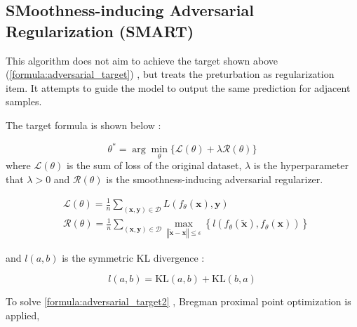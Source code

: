 \documentclass[10pt,twocolumn,letterpaper]{article}
\begin{document}
\subsection{SMoothness-inducing Adversarial Regularization (SMART)}

This algorithm does not aim to achieve the target shown above (\cref{formula:adversarial_target}) , but treats the preturbation as regularization item. It attempts to guide the model to output the same prediction for adjacent samples. 

The target formula is shown below :

\begin{equation}
  \theta^*=\arg\min_\theta\{\mathcal{L}(\theta)+\lambda \mathcal{R}(\theta)\}
  \tag{2:4:1}
  \label{formula:adversarial_target2}
\end{equation}
where $\mathcal{L}(\theta)$ is the sum of loss of the original dataset, $\lambda$ is the hyperparameter that $\lambda>0$ and $\mathcal{R}(\theta)$ is the smoothness-inducing adversarial regularizer.

$$
\begin{aligned}
  &\mathcal{L}(\theta)=\frac{1}{n}\sum_{(\mathbf{x}, \mathbf{y})\in\mathcal{D}} L(f_\theta(\mathbf{x}), \mathbf{y}) \\
  &\mathcal{R}(\theta)=\frac{1}{n}\sum_{(\mathbf{x}, \mathbf{y})\in\mathcal{D}} \max_{\left\Vert \tilde{\mathbf{x}}-\mathbf{x}\right\Vert\leq \epsilon}\left\{l\left(f_\theta(\tilde{\mathbf{x}}), f_\theta(\mathbf{x})\right)\right\}
\end{aligned}
$$

and $l(a, b)$ is the symmetric KL divergence :

$$
l(a, b)=\mathrm{KL}(a, b) + \mathrm{KL}(b, a)
$$

To solve \cref{formula:adversarial_target2} , Bregman proximal point optimization is applied, 

{\small


}
\end{document}
